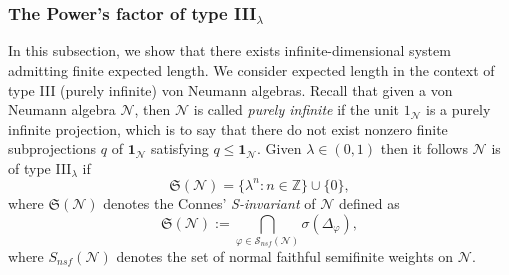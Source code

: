 \documentclass[11pt,reqno]{amsart}
\numberwithin{equation}{section}
\newcommand{\mc}{\mathcal}
\begin{document}
\subsubsection{The Power's factor of type III$_\lambda$}
In this subsection, we show that there exists infinite-dimensional system admitting finite expected length. We consider expected length in the context of type III (purely infinite) von Neumann algebras. Recall that given a von Neumann algebra $\mc N$, then $\mc N$ is called \emph{purely infinite} if the unit $1_{\mc N}$ is a purely infinite projection, which is to say that there do not exist nonzero finite subprojections $q$ of $\textbf{1}_{\mc N}$ satisfying $q \leq \textbf{1}_{\mc N}$. Given $\lambda \in (0,1)$ then it follows $\mc N$ is of type III$_\lambda$ if \[
\mathfrak{S}(\mc N) = \{\lambda^n: n \in \mathbb Z\} \cup \{0\},
\] where $\mathfrak{S}(\mc N)$ denotes the Connes' \emph{S-invariant} of $\mc N$ defined as \[
\mathfrak{S}(\mc N):= \bigcap_{\varphi \in \mathcal S_{nsf}(\mc N)} \sigma(\Delta_{\varphi}),
\] where $S_{nsf}(\mc N)$ denotes the set of normal faithful semifinite weights on $\mc N$. 
\end{document}
